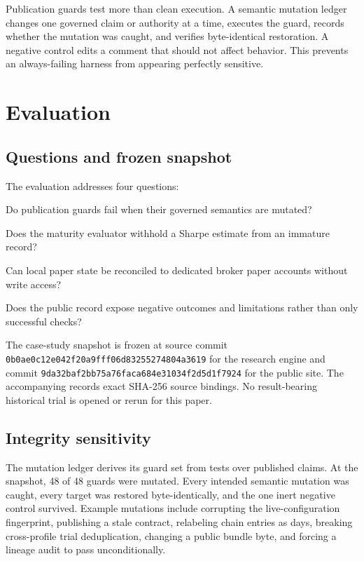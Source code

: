 \documentclass[11pt]{article}
\newcommand{\code}[1]{\texttt{#1}}
\begin{document}
Publication guards test more than clean execution. A semantic mutation ledger changes one governed claim or authority at a time, executes the guard, records whether the mutation was caught, and verifies byte-identical restoration. A negative control edits a comment that should not affect behavior. This prevents an always-failing harness from appearing perfectly sensitive.

\section{Evaluation}

\subsection{Questions and frozen snapshot}

The evaluation addresses four questions:

\begin{description}[style=nextline]
  \item[RQ1: Integrity sensitivity.] Do publication guards fail when their governed semantics are mutated?
  \item[RQ2: Premature-claim suppression.] Does the maturity evaluator withhold a Sharpe estimate from an immature record?
  \item[RQ3: Execution provenance.] Can local paper state be reconciled to dedicated broker paper accounts without write access?
  \item[RQ4: Boundary visibility.] Does the public record expose negative outcomes and limitations rather than only successful checks?
\end{description}

The case-study snapshot is frozen at source commit \code{0b0ae0c12e042f20a9fff06d83255274804a3619} for the research engine and commit \code{9da32baf2bb75a76faca684e31034f2d5d1f7924} for the public site. The accompanying  records exact SHA-256 source bindings. No result-bearing historical trial is opened or rerun for this paper.

\subsection{Integrity sensitivity}

The mutation ledger derives its guard set from tests over published claims. At the snapshot, 48 of 48 guards were mutated. Every intended semantic mutation was caught, every target was restored byte-identically, and the one inert negative control survived. Example mutations include corrupting the live-configuration fingerprint, publishing a stale contract, relabeling chain entries as days, breaking cross-profile trial deduplication, changing a public bundle byte, and forcing a lineage audit to pass unconditionally.
\end{document}

